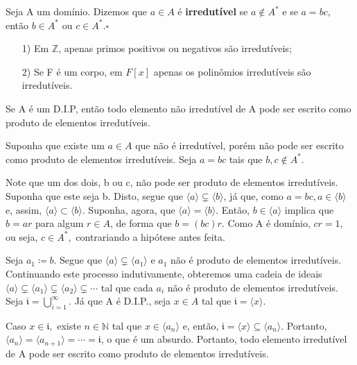 \documentclass[AlgebraII/algebraII_notes.tex]{subfiles}
\begin{document}
\begin{def*}
	Seja A um domínio. Dizemos que \(a\in A\) é \textbf{irredutível} se \(a\not\in A^{*}\) e se \(a = bc,\) então \(b\in A^{*}\) ou \(c\in A^{*}.\square\)
\end{def*}
\begin{example}
	\begin{itemize}
		\item[1)] Em \(\mathbb{Z}\), apenas primos positivos ou negativos são irredutíveis;
		\item[2)] Se F é um corpo, em \(F[x]\) apenas os polinômios irredutíveis são irredutíveis.
	\end{itemize}
\end{example}
\begin{theorem*}
	Se A é um D.I.P, então todo elemento não irredutível de A pode ser escrito como produto de elementos irredutíveis.
\end{theorem*}
\begin{proof*}
	Suponha que existe um \(a\in A\) que não é irredutível, porém não pode ser escrito como produto de
	elementos irredutíveis. Seja \(a=bc\) tais que \(b, c\not\in A^{*}.\)

	Note que um dos dois, b ou c, não pode ser produto de elementos irredutíveis. Suponha que este seja b.
	Disto, segue que \(\langle a \rangle\subsetneq{\langle b \rangle}\), já que, como \(a=bc, a\in \langle b \rangle\) e, assim,
	\(\langle a \rangle\subset{\langle b \rangle}\). Suponha, agora, que \(\langle a \rangle = \langle b \rangle.\) Então, \(b\in \langle a \rangle\) implica
	que \(b = ar\) para algum \(r\in A\), de forma que \(b = (bc)r.\) Como A é domínio, \(cr = 1\), ou seja, \(c\in A^{*},\)
	contrariando a hipótese antes feita.

	Seja \(a_{1}\coloneqq b.\) Segue que \(\langle a \rangle\subsetneq{\langle a_{1} \rangle}\) e \(a_{1}\) não é produto de elementos irredutíveis.
	Continuando este processo indutivamente, obteremos uma cadeia de ideais \(\langle a \rangle \subsetneq{\langle a_{1} \rangle}\subsetneq{\langle a_{2} \rangle}\subsetneq{\cdots}\)
	tal que cada \(a_{i}\) não é produto de elementos irredutíveis. Seja \(\mathfrak{i} = \bigcup_{i=1}^{\infty}{}\). Já que A é D.I.P., seja \(x\in A\) tal que \(\mathfrak{i} = \langle x \rangle\).

	Caso \(x\in \mathfrak{i},\) existe \(n\in \mathbb{N}\) tal que \(x\in \langle a_{n} \rangle\) e, então, \(\mathfrak{i} = \langle x \rangle\subseteq{\langle a_{n} \rangle}.\) Portanto,
	\(\langle a_{n} \rangle = \langle a_{n+1} \rangle = \cdots = \mathfrak{i}\), o que é um absurdo. Portanto, todo elemento irredutível de A
	pode ser escrito como produto de elementos irredutíveis. \qedsymbol
\end{proof*}
\end{document}
